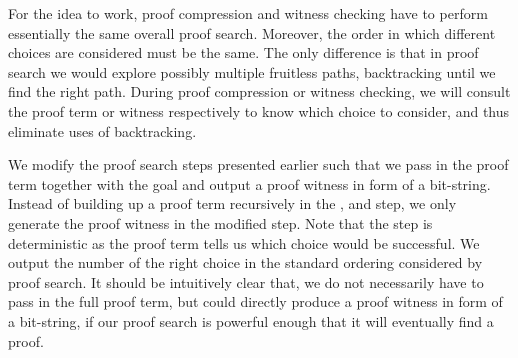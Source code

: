 \documentclass{acmconf}
\begin{document}

For the idea to work, proof compression and witness checking have to
perform essentially the same overall proof search. Moreover, the order
in which different choices are considered must be the same.  The only
difference is that in proof search we would explore possibly multiple
fruitless paths, backtracking until we find the right path. During
proof compression or witness checking, we will consult the proof term
or witness respectively to know which choice to consider, and thus
eliminate uses of backtracking.

We modify the proof search steps presented earlier such that we pass
in the proof term together with the goal and output a proof witness in
form of a bit-string. Instead of building up a proof term recursively
in the {}, {} and {} step, we
only generate the proof witness in the modified {} step.
Note that the {} step is deterministic as the proof term
tells us which choice would be successful. We output the number of the
right choice in the standard ordering considered by proof search. It
should be intuitively clear that, we do not necessarily have to pass
in the full proof term, but could directly produce a proof witness in
form of a bit-string, if our proof search is powerful enough that it
will eventually find a proof.
\end{document}
